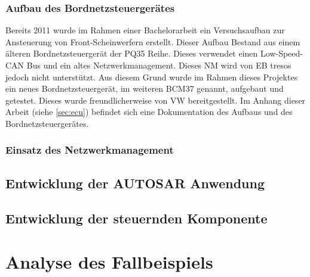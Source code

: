 \documentclass[
  a4paper,					    %
  twoside,
  DIV=calc,     				%
  bibliography=totoc,
  cleardoublepage=empty,
  ngerman,     					%
  final       					%
]{scrbook}
\begin{document}
\subsection{Aufbau des Bordnetzsteuergerätes}
\label{sec:Aufbau_der_ECU}
Bereits 2011 wurde im Rahmen einer Bachelorarbeit ein Versuchsaufbau zur Ansteuerung von Front-Scheinwerfern erstellt. Dieser Aufbau Bestand aus einem älteren Bordnetzsteuergerät der PQ35 Reihe. Dieses verwendet einen Low-Speed-CAN Bus und ein altes Netzwerkmanagement. Dieses NM wird von EB tresos jedoch nicht unterstützt. Aus diesem Grund wurde im Rahmen dieses Projektes ein neues Bordnetzsteuergerät, im weiteren BCM37 genannt, aufgebaut und getestet. Dieses wurde freundlicherweise von VW bereitgestellt. Im Anhang dieser Arbeit (siehe \ref{sec:ecu}) befindet sich eine Dokumentation des Aufbaus und des Bordnetzsteuergerätes.



\subsection{Einsatz des Netzwerkmanagement}
\label{sec:AutosarNM}







\section{Entwicklung der AUTOSAR Anwendung}
\label{sec:entwicklung_autosar}


\section{Entwicklung der steuernden Komponente}
\label{sec:entwicklung_vcan_app}






\chapter{Analyse des Fallbeispiels}
\label{sec:Beispiel_Analyse}
\end{document}
